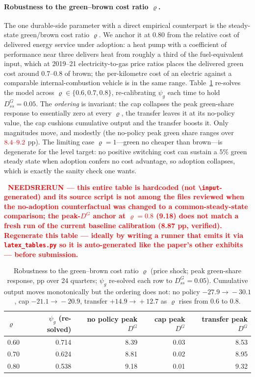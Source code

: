 \documentclass[11pt,a4paper]{article}
\newcommand{\NEEDSRERUN}[1]{\textcolor{red}{#1}}
\begin{document}
\paragraph{Robustness to the green--brown cost ratio $\varrho$.} The one
durable-side parameter with a direct empirical counterpart is the steady-state
green/brown cost ratio $\varrho$. We anchor it at $0.80$ from the relative cost
of delivered energy service under adoption: a heat pump with a coefficient of
performance near three delivers heat from roughly a third of the fuel-equivalent
input, which at 2019--21 electricity-to-gas price ratios places the delivered
green cost around $0.7$--$0.8$ of brown; the per-kilometre cost of an electric
against a comparable internal-combustion vehicle is in the same range.
Table~\ref{tab:rho} re-solves the model across $\varrho\in\{0.6,0.7,0.8\}$,
re-calibrating $\psi_g$ each time to hold $D^{G}_{ss}=0.05$. The \emph{ordering}
is invariant: the cap collapses the peak green-share response to essentially
zero at every $\varrho$, the transfer leaves it at its no-policy value, the cap
cushions cumulative output and the transfer boosts it. Only magnitudes move, and
modestly (the no-policy peak green share ranges over $\NEEDSRERUN{8.4\text{--}9.2}$ pp). The
limiting case $\varrho=1$---green no cheaper than brown---is degenerate for the
level target: no positive switching cost can sustain a $5\%$ green steady state
when adoption confers no cost advantage, so adoption collapses, which is exactly
the sanity check one wants.

\begin{table}[H]\centering\small
\textcolor{red}{\bfseries\textdagger\ NEEDSRERUN --- this entire table is
hardcoded (not \texttt{\textbackslash input}-generated) and its source script
is not among the files reviewed when the no-adoption counterfactual was changed
to a common-steady-state comparison; the peak-$D^{G}$ anchor at $\varrho=0.8$
(9.18) does not match a fresh run of the current baseline calibration (8.87 pp,
verified). Regenerate this table --- ideally by writing a runner that emits it
via \texttt{latex\_tables.py} so it is auto-generated like the paper's other
exhibits --- before submission.}\par\smallskip
\begin{tabular}{lrrrr}
\toprule
$\varrho$ & $\psi_g$ (re-solved) & no policy peak $D^{G}$ & cap peak $D^{G}$ & transfer peak $D^{G}$\\
\midrule
0.60 & 0.714 & 8.39 & 0.03 & 8.53\\
0.70 & 0.624 & 8.81 & 0.02 & 8.95\\
0.80 & 0.538 & 9.18 & 0.01 & 9.32\\
\bottomrule
\end{tabular}
\caption{Robustness to the green--brown cost ratio $\varrho$ (price shock; peak
green-share response, pp over 24 quarters; $\psi_g$ re-solved each row to
$D^{G}_{ss}=0.05$). Cumulative output moves monotonically but the ordering does
not: no policy $-27.9\!\to\!-30.1$, cap $-21.1\!\to\!-20.9$, transfer
$+14.9\!\to\!+12.7$ as $\varrho$ rises from $0.6$ to $0.8$.}
\label{tab:rho}
\end{table}
\end{document}
